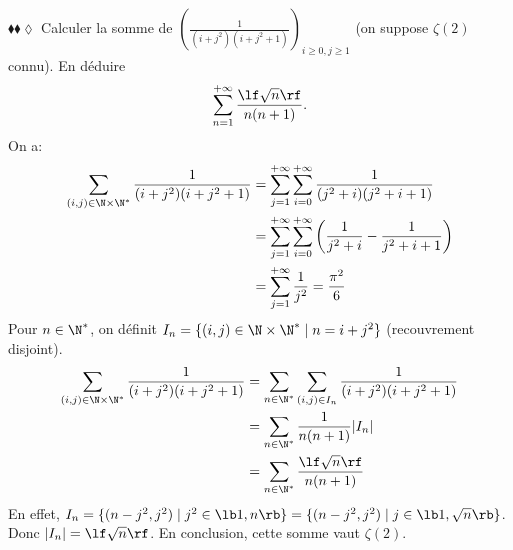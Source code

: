 \documentclass[11pt]{article}
\begin{document}
\begin{exercice}{$\blacklozenge\blacklozenge\lozenge$}{}
    Calculer la somme de \Large$\left( \frac{1}{(i+j^2)(i+j^2+1)} \right)_{i\geq 0,j\geq1}$ \normalsize (on suppose $\zeta(2)$ connu). En déduire
    \begin{equation*}
        \sum_{n=1}^{+\infty}\frac{\lf \sqrt{n} \rf}{n(n+1)}.
    \end{equation*}
    \tcblower
    On a:
    \begin{align*}
        \sum_{(i,j)\in\N\times\N^*}\frac{1}{(i+j^2)(i+j^2+1)}&=\sum_{j=1}^{+\infty}\sum_{i=0}^{+\infty}\frac{1}{(j^2+i)(j^2+i+1)}\\
        &=\sum_{j=1}^{+\infty}\sum_{i=0}^{+\infty}\left( \frac{1}{j^2+i}-\frac{1}{j^2+i+1} \right)\\
        &=\sum_{j=1}^{+\infty}\frac{1}{j^2}=\frac{\pi^2}{6}
    \end{align*}
    Pour $n\in\N^*$, on définit $I_n=\{(i,j)\in\N\times\N^*\mid n=i+j^2\}$ (recouvrement disjoint).
    \begin{align*}
        \sum_{(i,j)\in\N\times\N^*}\frac{1}{(i+j^2)(i+j^2+1)}&=\sum_{n\in\N^*}\sum_{(i,j)\in I_n}\frac{1}{(i+j^2)(i+j^2+1)}\\
        &=\sum_{n\in\N^*}\frac{1}{n(n+1)}|I_n|\\
        &=\sum_{n\in\N^*}\frac{\lf \sqrt{n} \rf}{n(n+1)}
    \end{align*}
    En effet, $I_n=\{(n-j^2,j^2)\mid j^2\in\lb1,n\rb\}=\{(n-j^2,j^2)\mid j\in\lb1,\sqrt{n}\rb\}$. Donc $|I_n|=\lf\sqrt{n}\rf$.\n
    En conclusion, cette somme vaut $\zeta(2)$.
\end{exercice}
\end{document}
